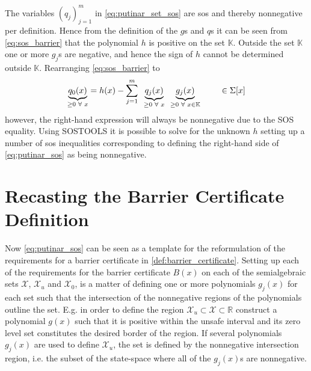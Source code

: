 The variables $(q_j)_{j=1}^m$ in \autoref{eq:putinar_set_sos} are \gls{sos} and thereby nonnegative per definition. Hence from the definition of the $g$s and $q$s it can be seen from \autoref{eq:sos_barrier} that the polynomial $h$ is positive on the set $\mathbb{K}$.
Outside the set $\mathbb{K}$ one or more $g_j$s are negative, and hence the sign of $h$ cannot be determined outside $\mathbb{K}$.
Rearranging \autoref{eq:sos_barrier} to
\vspace{-2mm}
\begin{equation}
\underbrace{q_0(x)}_{\geq 0\,\,\forall \,\,x} = h(x) - \sum _{j=1}^{m}\,\,\,\underbrace{q_j(x)}_{\geq 0\,\,\forall \,\,x}\,\,\,\underbrace{g_j(x)}_{\geq 0 \,\,\forall \,\,x\in\mathbb{K}} \hspace{0.8cm} \in\Sigma[x]\label{eq:putinar_sos}
\end{equation} 
\vspace{-1mm}
however, the right-hand expression will always be nonnegative due to the SOS equality. Using SOSTOOLS  it is possible to solve for the unknown $h$ setting up a number of \gls{sos} inequalities corresponding to defining the right-hand side of \autoref{eq:putinar_sos} as being nonnegative. %

\section{Recasting the Barrier Certificate Definition}
\vspace{-2mm}
Now \autoref{eq:putinar_sos} can be seen as a template for the reformulation of the requirements for a barrier certificate in \autoref{def:barrier_certificate}.
Setting up each of the requirements for the barrier certificate $B(x)$ on each of the  semialgebraic sets $\mathcal{X}$, $\mathcal{X}_u$ and $\mathcal{X}_0$, is a matter of defining one or more polynomials $g_j(x)$ for each set such that the intersection of the nonnegative regions of the polynomials outline the set.
E.g. in order to define the region $\mathcal{X}_u\subset\mathcal{X}\subset\mathbb{R}$ construct a polynomial $g(x)$ such that it is positive within the unsafe interval and its zero level set constitutes the desired border of the region. If several polynomials $g_j(x)$ are used to define $\mathcal{X}_u$, the set is defined by the nonnegative intersection region, i.e. the subset of the state-space where all of the $g_j(x)$s are nonnegative.

